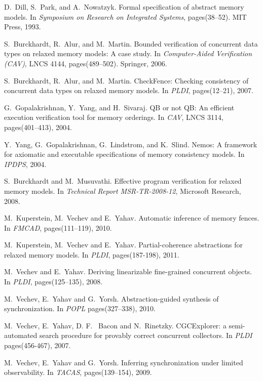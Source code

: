 \documentclass[preprint,9pt]{sigplanconf}
\begin{document}
\begin{thebibliography}{10}
{
D.~Dill, S.~Park, and A.~Nowatzyk. 
\newblock Formal specification of abstract memory models.
\newblock In {\em Symposium on Research on Integrated Systems}, pages(38–52). MIT Press, 1993.

S.~Burckhardt, R.~Alur, and M.~Martin. 
\newblock Bounded verification of concurrent data types on relaxed memory models: A case study. 
\newblock In {\em Computer-Aided Verification (CAV)}, LNCS 4144, pages(489–502). Springer, 2006.

S.~Burckhardt, R.~Alur, and M.~Martin. 
\newblock CheckFence: Checking consistency of concurrent data types on relaxed memory models.
\newblock In {\em PLDI}, pages(12–21), 2007.

G.~Gopalakrishnan, Y.~Yang, and H.~Sivaraj.
\newblock QB or not QB: An efficient execution verification tool for memory orderings.
\newblock In {\em CAV}, LNCS 3114, pages(401–413), 2004.

Y.~Yang, G.~Gopalakrishnan, G.~Lindstrom, and K.~Slind.
\newblock Nemos: A framework for axiomatic and executable specifications of memory consistency models. 
\newblock In {\em IPDPS}, 2004.

S.~Burckhardt and M.~Musuvathi.
\newblock Effective program verification for relaxed memory models.
\newblock In {\em Technical Report MSR-TR-2008-12}, Microsoft Research, 2008.

M.~Kuperstein, M.~Vechev and E.~Yahav.
\newblock Automatic inference of memory fences.
\newblock In {\em FMCAD}, pages(111–119), 2010.

M.~Kuperstein, M.~Vechev and E.~Yahav.
\newblock Partial-coherence abstractions for relaxed memory models.
\newblock In {\em PLDI}, pages(187-198), 2011.

M.~Vechev and E.~Yahav.
\newblock Deriving linearizable fine-grained concurrent objects.
\newblock In {\em PLDI}, pages(125–135), 2008.

M.~Vechev, E.~Yahav and G.~Yorsh.
\newblock Abstraction-guided synthesis of synchronization.
\newblock In {\em POPL}  pages(327–338), 2010.

M.~Vechev, E.~Yahav, D. F.~ Bacon and N.~Rinetzky.
\newblock CGCExplorer: a semi-automated search procedure for provably correct concurrent collectors.
\newblock In {\em PLDI} pages(456-467), 2007.

M.~Vechev, E.~Yahav and G.~Yorsh.
\newblock Inferring synchronization under limited observability. 
\newblock In {\em TACAS}, pages(139–154), 2009.

}
\end{thebibliography}
\end{document}

